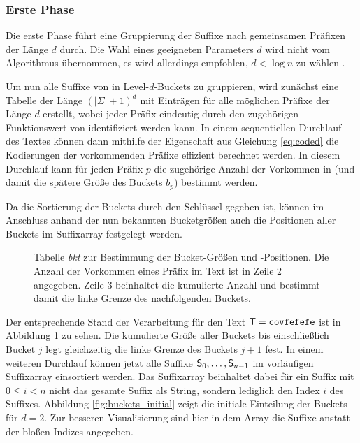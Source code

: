\subsubsection{Erste Phase}
\label{bpr:algorithmus:phase1}

Die erste Phase führt eine Gruppierung der Suffixe nach gemeinsamen Präfixen der Länge \(d\) durch. Die Wahl eines geeigneten Parameters \(d\) wird nicht vom Algorithmus übernommen, es wird allerdings empfohlen, \(d < \log n\) zu wählen \cite{saca:2}.\par
Um nun alle Suffixe von  in Level-\(d\)-Buckets zu gruppieren, wird zunächst eine Tabelle \bkt der Länge \((|\Sigma| + 1)^d\) mit Einträgen für alle möglichen Präfixe der Länge \(d\) erstellt, wobei jeder Präfix eindeutig durch den zugehörigen Funktionswert von \coded identifiziert werden kann. In einem sequentiellen Durchlauf des Textes  können dann mithilfe der Eigenschaft aus Gleichung \ref{eq:coded} die Kodierungen der vorkommenden Präfixe effizient berechnet werden. In diesem Durchlauf kann für jeden Präfix \(p\) die zugehörige Anzahl der Vorkommen in  (und damit die spätere Größe des Buckets \(b_p\)) bestimmt werden.\par
Da die Sortierung der Buckets durch den Schlüssel \coded gegeben ist, können im Anschluss anhand der nun bekannten Bucketgrößen auch die Positionen aller Buckets im Suffixarray festgelegt werden.
\begin{figure}[ht]
	\vspace{0.2\baselineskip}
	\caption[Tabelle \emph{bkt} zur Bestimmung der Bucket-Größen und -Positionen]{Tabelle \emph{bkt} zur Bestimmung der Bucket-Größen und -Positionen. Die Anzahl der Vorkommen eines Präfix im Text ist in Zeile 2 angegeben. Zeile 3 beinhaltet die kumulierte Anzahl und bestimmt damit die linke Grenze des nachfolgenden Buckets.}
	\label{fig:bkt}
\end{figure}
Der entsprechende Stand der Verarbeitung für den Text \(\inputtext = \covfefefe\) ist in Abbildung \ref{fig:bkt} zu sehen. Die kumulierte Größe aller Buckets bis einschließlich Bucket \(j\) legt gleichzeitig die linke Grenze des Buckets \(j+1\) fest. In einem weiteren Durchlauf können jetzt alle Suffixe \(\mathsf{S}_{0}, \ldots, \mathsf{S}_{n-1}\) im vorläufigen Suffixarray \sa einsortiert werden. Das Suffixarray beinhaltet dabei für ein Suffix  mit \(0 \leq i < n\) nicht das gesamte Suffix als String, sondern lediglich den Index \(i\) des Suffixes. Abbildung \ref{fig:buckets_initial} zeigt die initiale Einteilung der Buckets für \(d=2\). Zur besseren Visualisierung sind hier in dem Array die Suffixe anstatt der bloßen Indizes angegeben.\par\smallskip
